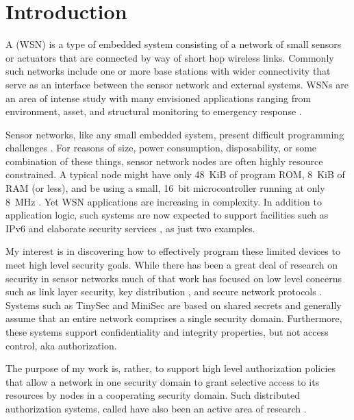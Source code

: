 \chapter{Introduction}
\label{chapter-introduction}

A  (WSN) is a type of embedded system consisting of a network
of small sensors or actuators that are connected by way of short hop wireless links. Commonly
such networks include one or more base stations with wider connectivity that serve as an
interface between the sensor network and external systems. WSNs are an area of intense study
with many envisioned applications ranging from environment, asset, and structural monitoring to
emergency response \cite{Culler:2004:GEI:1018015.1018072,1038146}.

Sensor networks, like any small embedded system, present difficult programming challenges
\cite{Mottola:2011:PWS:1922649.1922656}. For reasons of size, power consumption, disposability,
or some combination of these things, sensor network nodes are often highly resource constrained.
A typical node might have only 48~KiB of program ROM, 8~KiB of RAM (or less), and be using a
small, 16~bit microcontroller running at only 8~MHz \cite{tmotesky-datasheet}. Yet WSN
applications are increasing in complexity. In addition to application logic, such systems are
now expected to support facilities such as IPv6 \cite{Hui:2008:IDL:1460412.1460415} and
elaborate security services \cite{perrig-2004}, as just two examples.

My interest is in discovering how to effectively program these limited devices to meet high
level security goals. While there has been a great deal of research on security in sensor
networks much of that work has focused on low level concerns such as link layer security, key
distribution \cite{camtepe-bulent-05}, and secure network protocols
\cite{1049776,fouladgar-3tls-2006}. Systems such as TinySec \cite{karlog-tinysec-2004} and
MiniSec \cite{luk-minisec-2007} are based on shared secrets and generally assume that an entire
network comprises a single security domain. Furthermore, these systems support confidentiality
and integrity properties, but not access control, aka authorization.

The purpose of my work is, rather, to support high level authorization policies that allow a
network in one security domain to grant selective access to its resources by nodes in a
cooperating security domain. Such distributed authorization systems, called  have also been an active area of research
\cite{chapin-skalka-wang-acmcs08}.

